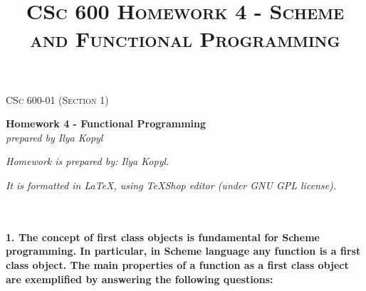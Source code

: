 \documentclass{article}
\begin{document}
	\setlength{\grammarparsep}{5pt plus 1pt minus 1pt} %
	\setlength{\grammarindent}{13em} %




	\begin{titlepage}
		\begin{center}
				\Large\textsc{CSc 600-01 (Section 1)}
				
				\Large\textbf{Homework 4 - Functional Programming}\\

				\Large\textit{prepared by Ilya Kopyl}
				
		\end{center}	
	\end{titlepage}


	\title{\textsc{CSc 600 Homework 4 - Scheme and Functional Programming}}	
	\maketitle
	
		\textit{Homework is prepared by: Ilya Kopyl.}

		\textit{It is formatted in LaTeX, using TeXShop editor (under GNU GPL license).}
		


	\rmfamily\




	\paragraph{1. The concept of first class objects is fundamental for Scheme programming. In particular, in Scheme language any function is a first class object. The main properties of a function as a first class object are exemplified by answering the following questions:}\
	\rmfamily\\\
		
\end{document}
